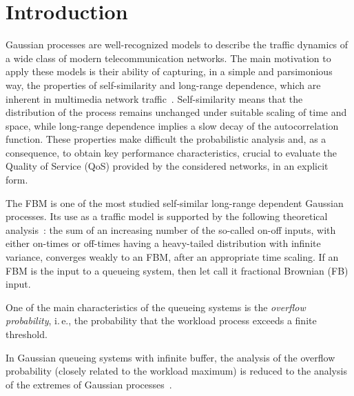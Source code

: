 



      \thispagestyle{myheadings}

      \begin{multicols}{2}

                  \label{st\stat}



\section{Introduction}

\noindent
Gaussian processes are well-recognized models to describe the
traffic dynamics of a wide class of modern telecommunication
networks. The main motivation to apply these  models is
their ability of capturing, in a simple and parsimonious way,
the properties of self-similarity and long-range dependence, which are
inherent in multimedia
network traffic~\cite{Leland, Willinger}. Self-similarity means that
the distribution of the process remains unchanged under suitable
scaling of time and space, while long-range dependence implies a
slow decay of the autocorrelation function. These properties make
difficult the probabilistic analysis and, as a consequence, to
obtain  key performance characteristics, crucial  to evaluate   the Quality
of Service (QoS) provided  by the considered networks,
 in an explicit form.

The FBM
is one of the most studied self-similar long-range dependent
Gaussian processes. Its use as a traffic model is supported  by the
following theoretical analysis~\cite{Taqqu}:
the sum of an increasing  number of the so-called on-off inputs,
with either on-times or off-times having a heavy-tailed distribution
with infinite variance, converges weakly to an FBM, after an
appropriate time  scaling. If an FBM is  the  input to a queueing
system, then  let call it  fractional Brownian (FB) input.


One of the main characteristics of the queueing systems is the  {\it
overflow probability}, i.\,e.,
the probability that the workload process exceeds a finite threshold.

In  Gaussian queueing systems with infinite buffer, the
analysis of the overflow probability (closely related  to the
workload maximum) is reduced to the analysis of the extremes of
Gaussian processes~\cite{Reich}.


\end{multicols}
